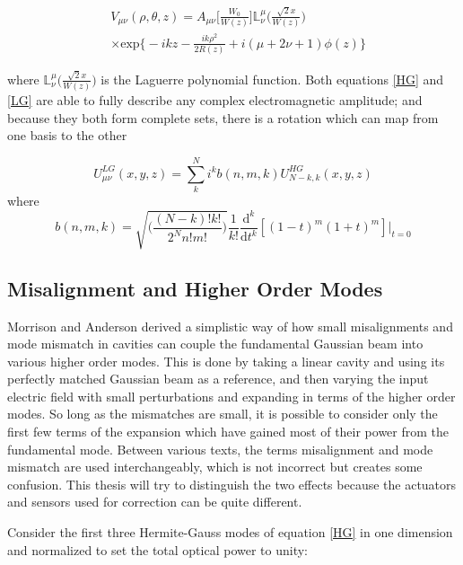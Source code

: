 		\begin{equation}\label{LG}
		\begin{aligned}
		&V_{\mu\nu}(\rho,\theta,z) = A_{\mu\nu}\bigg[ \frac{W_0}{W(z)} \bigg] \mathbb{L}^{\mu}_{\nu} \Bigg( \frac{\sqrt{2}x}{W(z)}  \Bigg) \\
		&\times \text{exp} \bigg\{-ikz-\frac{ik\rho^2}{2R(z)} + i(\mu+2\nu+1)\phi(z) \bigg\}
		\end{aligned}
		\end{equation}
		
		where $\mathbb{L}^{\mu}_{\nu} \Bigg( \frac{\sqrt{2}x}{W(z)}  \Bigg)$ is the Laguerre polynomial function. Both equations \ref{HG} and \ref{LG} are able to fully describe any complex electromagnetic amplitude; and because they both form complete sets, there is a rotation which can map from one basis to the other \cite{BEIJERSBERGEN} \cite{ONeilModeTransform}
		
		\begin{equation}
		U^{LG}_{\mu \nu} (x,y,z) = \sum\limits_{k}^{N} i^k b(n,m,k) U^{HG}_{N-k,k} (x,y,z)
		\end{equation}
		where
		\begin{equation}
		b(n,m,k) = \sqrt{\bigg( \frac{(N-k)!k!}{2^N n!m!} \bigg)} \frac{1}{k!} \frac{\text{d}^k}{\text{d}t^k}[(1-t)^m (1+t)^m]\vert_{t=0}
		\end{equation}

		\subsection{Misalignment and Higher Order Modes}\label{Misalign}
		Morrison and Anderson \cite{Anderson} \cite{Morrison} derived a simplistic way of how small misalignments and mode mismatch in cavities can couple the fundamental Gaussian beam into various higher order modes.  This is done by taking a linear cavity and using its perfectly matched Gaussian beam as a reference, and then varying the input electric field with small perturbations and expanding in terms of the higher order modes.  So long as the mismatches are small, it is possible to consider only the first few terms of the expansion which have gained most of their power from the fundamental mode.  Between various texts, the terms misalignment and mode mismatch are used interchangeably, which is not incorrect but creates some confusion.  This thesis will try to distinguish the two effects because the actuators and sensors used for correction can be quite different.
		
		Consider the first three Hermite-Gauss modes of equation \ref{HG} in one dimension and normalized to set the total optical power to unity:

